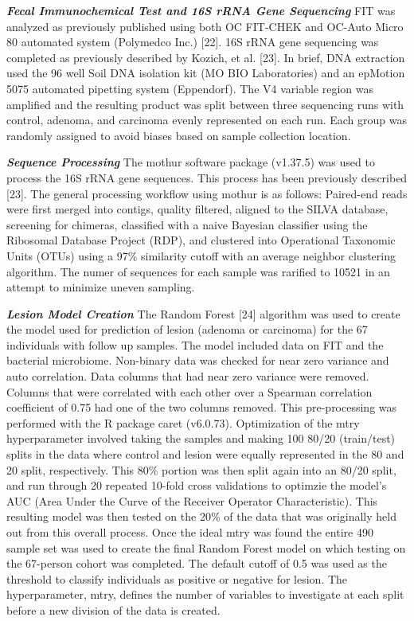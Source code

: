 \documentclass[12pt,]{article}
\begin{document}
\textbf{\emph{Fecal Immunochemical Test and 16S rRNA Gene Sequencing}}
FIT was analyzed as previously published using both OC FIT-CHEK and
OC-Auto Micro 80 automated system (Polymedco Inc.) {[}22{]}. 16S rRNA
gene sequencing was completed as previously described by Kozich, et al.
{[}23{]}. In brief, DNA extraction used the 96 well Soil DNA isolation
kit (MO BIO Laboratories) and an epMotion 5075 automated pipetting
system (Eppendorf). The V4 variable region was amplified and the
resulting product was split between three sequencing runs with control,
adenoma, and carcinoma evenly represented on each run. Each group was
randomly assigned to avoid biases based on sample collection location.

\textbf{\emph{Sequence Processing}} The mothur software package
(v1.37.5) was used to process the 16S rRNA gene sequences. This process
has been previously described {[}23{]}. The general processing workflow
using mothur is as follows: Paired-end reads were first merged into
contigs, quality filtered, aligned to the SILVA database, screening for
chimeras, classified with a naive Bayesian classifier using the
Ribosomal Database Project (RDP), and clustered into Operational
Taxonomic Units (OTUs) using a 97\% similarity cutoff with an average
neighbor clustering algorithm. The numer of sequences for each sample
was rarified to 10521 in an attempt to minimize uneven sampling.

\textbf{\emph{Lesion Model Creation}} The Random Forest {[}24{]}
algorithm was used to create the model used for prediction of lesion
(adenoma or carcinoma) for the 67 individuals with follow up samples.
The model included data on FIT and the bacterial microbiome. Non-binary
data was checked for near zero variance and auto correlation. Data
columns that had near zero variance were removed. Columns that were
correlated with each other over a Spearman correlation coefficient of
0.75 had one of the two columns removed. This pre-processing was
performed with the R package caret (v6.0.73). Optimization of the mtry
hyperparameter involved taking the samples and making 100 80/20
(train/test) splits in the data where control and lesion were equally
represented in the 80 and 20 split, respectively. This 80\% portion was
then split again into an 80/20 split, and run through 20 repeated
10-fold cross validations to optimzie the model's AUC (Area Under the
Curve of the Receiver Operator Characteristic). This resulting model was
then tested on the 20\% of the data that was originally held out from
this overall process. Once the ideal mtry was found the entire 490
sample set was used to create the final Random Forest model on which
testing on the 67-person cohort was completed. The default cutoff of 0.5
was used as the threshold to classify individuals as positive or
negative for lesion. The hyperparameter, mtry, defines the number of
variables to investigate at each split before a new division of the data
is created.
\end{document}
